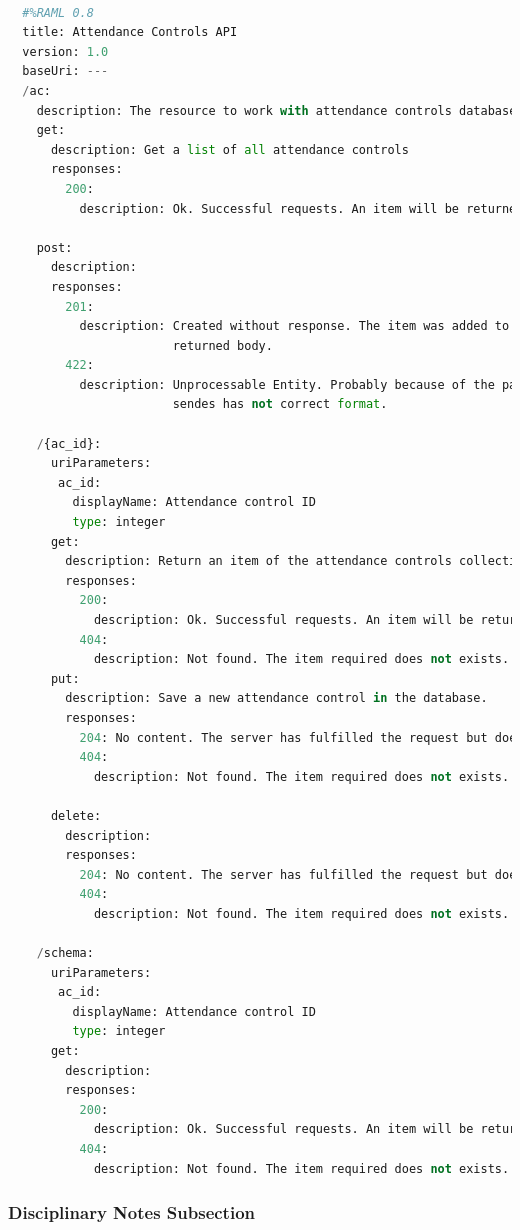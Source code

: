 \begin{lstlisting}[language=python,frame=none]

  #%RAML 0.8
  title: Attendance Controls API
  version: 1.0
  baseUri: ---
  /ac:
    description: The resource to work with attendance controls database saved-
    get:
      description: Get a list of all attendance controls
      responses:
        200:
          description: Ok. Successful requests. An item will be returned.

    post:
      description:
      responses:
        201:
          description: Created without response. The item was added to database will not
                       returned body.
        422:
          description: Unprocessable Entity. Probably because of the payload
                       sendes has not correct format.

    /{ac_id}:
      uriParameters:
       ac_id:
         displayName: Attendance control ID
         type: integer
      get:
        description: Return an item of the attendance controls collection.
        responses:
          200:
            description: Ok. Successful requests. An item will be returned.
          404:
            description: Not found. The item required does not exists.
      put:
        description: Save a new attendance control in the database.
        responses:
          204: No content. The server has fulfilled the request but does not need to return an entity-body.
          404:
            description: Not found. The item required does not exists.

      delete:
        description:
        responses:
          204: No content. The server has fulfilled the request but does not need to return an entity-body.
          404:
            description: Not found. The item required does not exists.

    /schema:
      uriParameters:
       ac_id:
         displayName: Attendance control ID
         type: integer
      get:
        description:
        responses:
          200:
            description: Ok. Successful requests. An item will be returned.
          404:
            description: Not found. The item required does not exists.

\end{lstlisting}

\subsubsection{Disciplinary Notes Subsection}

